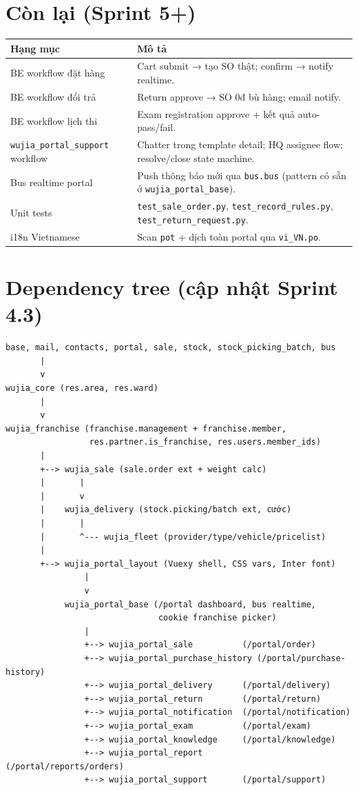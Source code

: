 \section{Còn lại (Sprint 5+)}

\begin{longtable}{p{5cm} p{9cm}}
\toprule
\textbf{Hạng mục} & \textbf{Mô tả} \\
\midrule
\endhead
BE workflow đặt hàng & Cart submit → tạo SO thật; confirm → notify realtime. \\
BE workflow đổi trả & Return approve → SO 0đ bù hàng; email notify. \\
BE workflow lịch thi & Exam registration approve + kết quả auto-pass/fail. \\
\texttt{wujia\_portal\_support} workflow & Chatter trong template detail; HQ assignee flow; resolve/close state machine. \\
Bus realtime portal & Push thông báo mới qua \texttt{bus.bus} (pattern có sẵn ở \texttt{wujia\_portal\_base}). \\
Unit tests & \texttt{test\_sale\_order.py}, \texttt{test\_record\_rules.py}, \texttt{test\_return\_request.py}. \\
i18n Vietnamese & Scan \texttt{pot} + dịch toàn portal qua \texttt{vi\_VN.po}. \\
\bottomrule
\end{longtable}

\section{Dependency tree (cập nhật Sprint 4.3)}

\begin{lstlisting}[style=shell]
base, mail, contacts, portal, sale, stock, stock_picking_batch, bus
       |
       v
wujia_core (res.area, res.ward)
       |
       v
wujia_franchise (franchise.management + franchise.member,
                 res.partner.is_franchise, res.users.member_ids)
       |
       +--> wujia_sale (sale.order ext + weight calc)
       |       |
       |       v
       |    wujia_delivery (stock.picking/batch ext, cước)
       |       |
       |       ^--- wujia_fleet (provider/type/vehicle/pricelist)
       |
       +--> wujia_portal_layout (Vuexy shell, CSS vars, Inter font)
                |
                v
            wujia_portal_base (/portal dashboard, bus realtime,
                               cookie franchise picker)
                |
                +--> wujia_portal_sale          (/portal/order)
                +--> wujia_portal_purchase_history (/portal/purchase-history)
                +--> wujia_portal_delivery      (/portal/delivery)
                +--> wujia_portal_return        (/portal/return)
                +--> wujia_portal_notification  (/portal/notification)
                +--> wujia_portal_exam          (/portal/exam)
                +--> wujia_portal_knowledge     (/portal/knowledge)
                +--> wujia_portal_report        (/portal/reports/orders)
                +--> wujia_portal_support       (/portal/support)
\end{lstlisting}

